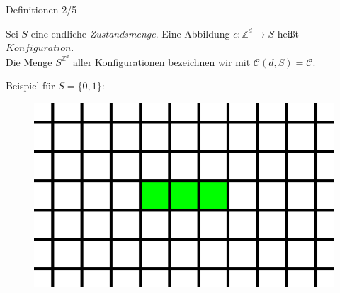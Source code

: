 \documentclass[aspectratio=169]{beamer}
\begin{document}
  \begin{frame}{Definitionen 2/5}
    \begin{definition*}
      Sei $S$ eine endliche \textit{Zustandsmenge}. Eine Abbildung $c: \mathbb{Z}^d \to S$  heißt $Konfiguration$. \\
      Die Menge $S^{\mathbb{Z}^d}$ aller Konfigurationen bezeichnen wir mit $\mathcal{C}(d, S) = \mathcal{C}$.
    \end{definition*}

    \pause

    Beispiel für $S = \{0, 1\}$:
    \begin{figure}[H]
        \centering
        \includegraphics[width = 0.35 \textheight]{configuration.png}
    \end{figure}

  \end{frame}
\end{document}
